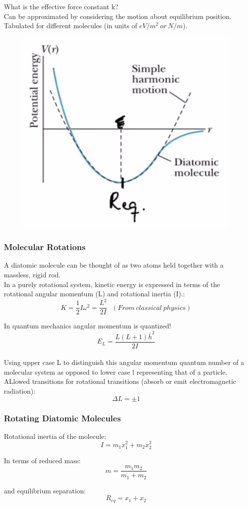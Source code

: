 \documentclass[class=article,crop=false]{standalone}
\begin{document}
What is the effective force constant k?\\
Can be approximated by considering the motion about equilibrium position. Tabulated for different molecules (in units of $eV/m^2\ or\ N/m$).

\begin{figure}[h!]
	\centering
	\includegraphics[width=.4\linewidth]{./Images/effective_force.png}
	\caption{}
\end{figure}

\subsubsection{Molecular Rotations}
A diatomic molecule can be thought of as two atoms held together with a massless, rigid rod. \\
In a purely rotational system, kinetic energy is expressed in terms of the rotational angular momentum (L) and rotational inertia (I).:
$$ K = \frac{1}{2} I\omega^2 = \frac{L^2}{2I} \ \ \ (From\ classical\ physics)$$

In quantum mechanics angular momentum is quantized!
$$ E_L = \frac{L(L+1)\bar{h}^2}{2I} $$
\\

Using upper case L to distinguish this angular momentum quantum number of a molecular system as opposed to lower case l representing that of a particle.\\

ALlowed transitions for rotational transitions (absorb or emit electromagnetic radiation):
$$ \Delta L = \pm 1 $$

\newpage
\subsubsection{Rotating Diatomic Molecules}
Rotational inertia of the molecule:
$$ I = m_1x_1^2 + m_2x_2^2 $$

In terms of reduced mass:
$$ m = \frac{m_1m_2}{m_1+m_2} $$

and equilibrium separation:
$$ R_{eq} = x_1 + x_2 $$
\end{document}
